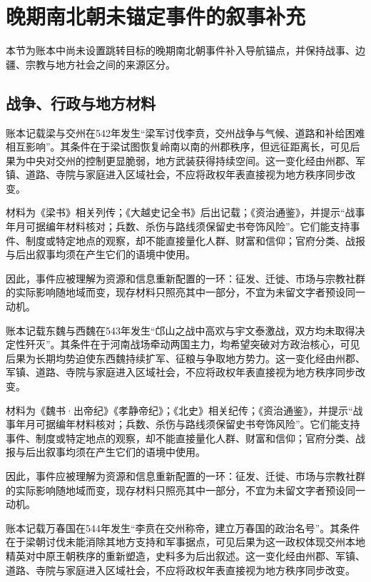 \section{晚期南北朝未锚定事件的叙事补充}

\label{sec:anchor-batch-two-late-ns}

本节为账本中尚未设置跳转目标的晚期南北朝事件补入导航锚点，并保持战事、边疆、宗教与地方社会之间的来源区分。

\subsection{战争、行政与地方材料}

账本记载梁与交州在542年发生“梁军讨伐李贲，交州战争与气候、道路和补给困难相互影响”。其条件在于梁试图恢复岭南以南的州郡秩序，但远征距离长，可见后果为中央对交州的控制更显脆弱，地方武装获得持续空间。这一变化经由州郡、军镇、道路、寺院与家庭进入区域社会，不应将政权年表直接视为地方秩序同步改变。

材料为《梁书》相关列传；《大越史记全书》后出记载；《资治通鉴》，并提示“战事年月可据编年材料核对；兵数、杀伤与路线须保留史书夸饰风险”。它们能支持事件、制度或特定地点的观察，却不能直接量化人群、财富和信仰；官府分类、战报与后出叙事均须在产生它们的语境中使用。

因此，事件应被理解为资源和信息重新配置的一环：征发、迁徙、市场与宗教社群的实际影响随地域而变，现存材料只照亮其中一部分，不宜为未留文字者预设同一动机。

账本记载东魏与西魏在543年发生“邙山之战中高欢与宇文泰激战，双方均未取得决定性歼灭”。其条件在于河南战场牵动两国主力，均希望突破对方政治核心，可见后果为长期均势迫使东西魏持续扩军、征粮与争取地方势力。这一变化经由州郡、军镇、道路、寺院与家庭进入区域社会，不应将政权年表直接视为地方秩序同步改变。

材料为《魏书·出帝纪》《孝静帝纪》；《北史》相关纪传；《资治通鉴》，并提示“战事年月可据编年材料核对；兵数、杀伤与路线须保留史书夸饰风险”。它们能支持事件、制度或特定地点的观察，却不能直接量化人群、财富和信仰；官府分类、战报与后出叙事均须在产生它们的语境中使用。

因此，事件应被理解为资源和信息重新配置的一环：征发、迁徙、市场与宗教社群的实际影响随地域而变，现存材料只照亮其中一部分，不宜为未留文字者预设同一动机。

账本记载万春国在544年发生“李贲在交州称帝，建立万春国的政治名号”。其条件在于梁朝讨伐未能消除其地方支持和军事据点，可见后果为这一政权体现交州本地精英对中原王朝秩序的重新塑造，史料多为后出叙述。这一变化经由州郡、军镇、道路、寺院与家庭进入区域社会，不应将政权年表直接视为地方秩序同步改变。

